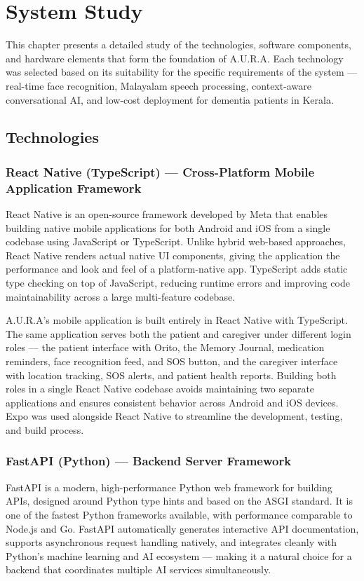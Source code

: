 \chapter{System Study}
This chapter presents a detailed study of the technologies, software components, and hardware elements that form the foundation of A.U.R.A. Each technology was selected based on its suitability for the specific requirements of the system --- real-time face recognition, Malayalam speech processing, context-aware conversational AI, and low-cost deployment for dementia patients in Kerala.

\section{Technologies}

\subsection{React Native (TypeScript) --- Cross-Platform Mobile Application Framework}
React Native is an open-source framework developed by Meta that enables building native mobile applications for both Android and iOS from a single codebase using JavaScript or TypeScript. Unlike hybrid web-based approaches, React Native renders actual native UI components, giving the application the performance and look and feel of a platform-native app. TypeScript adds static type checking on top of JavaScript, reducing runtime errors and improving code maintainability across a large multi-feature codebase.

A.U.R.A's mobile application is built entirely in React Native with TypeScript. The same application serves both the patient and caregiver under different login roles --- the patient interface with Orito, the Memory Journal, medication reminders, face recognition feed, and SOS button, and the caregiver interface with location tracking, SOS alerts, and patient health reports. Building both roles in a single React Native codebase avoids maintaining two separate applications and ensures consistent behavior across Android and iOS devices. Expo was used alongside React Native to streamline the development, testing, and build process.

\subsection{FastAPI (Python) --- Backend Server Framework}
FastAPI is a modern, high-performance Python web framework for building APIs, designed around Python type hints and based on the ASGI standard. It is one of the fastest Python frameworks available, with performance comparable to Node.js and Go. FastAPI automatically generates interactive API documentation, supports asynchronous request handling natively, and integrates cleanly with Python's machine learning and AI ecosystem --- making it a natural choice for a backend that coordinates multiple AI services simultaneously.

